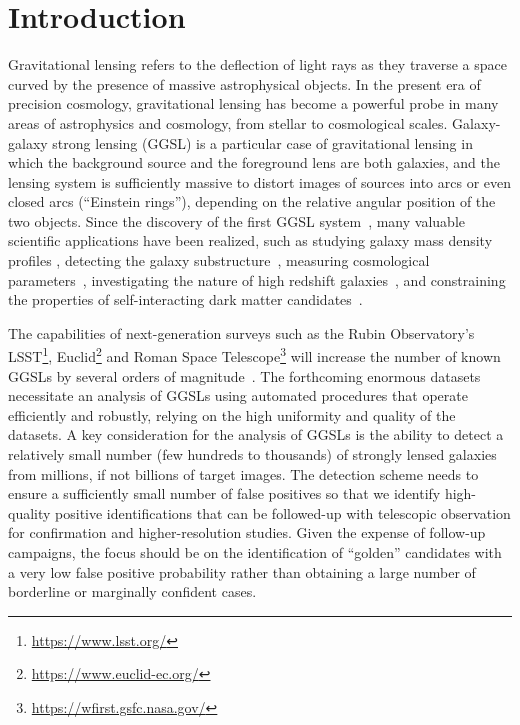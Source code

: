 \documentclass[12pt, twocolumn, apj]{openjournal}
\begin{document}
\section{Introduction}
Gravitational lensing refers to the deflection of light rays as they traverse a space curved by the presence of massive astrophysical objects. 
In the present era of precision cosmology, gravitational lensing has become a powerful probe in many areas of astrophysics and cosmology, from stellar to cosmological scales. 
Galaxy-galaxy strong lensing (GGSL) is a particular case of gravitational lensing in which the background source and the foreground lens are both galaxies, and the lensing system is sufficiently massive to distort images of sources into arcs or even closed arcs (``Einstein rings''), depending on the relative angular position of the two objects.
Since the discovery of the first GGSL system~\citep{Hewitt1988}, many valuable scientific applications have been realized, such as studying galaxy mass density profiles \citep{Sonnenfeld2015,Shu2016b,Kung2018}, detecting the galaxy substructure~\citep{Vegetti2014,Hezaveh2016,Bayer2018}, measuring cosmological parameters~\citep{Collett2014,Rana2017,Suyu2017}, investigating the nature of high redshift galaxies~\citep{Bayliss2017,Dye2018,Sharda2018}, and constraining the properties of self-interacting dark matter candidates~\citep{Shu2016,Gilman2017,Kummer2018}.

The capabilities of next-generation surveys such as the Rubin Observatory's LSST\footnote{\url{https://www.lsst.org/}},  Euclid\footnote{\url{https://www.euclid-ec.org/}} and Roman Space Telescope\footnote{\url{https://wfirst.gsfc.nasa.gov/}} 
will increase the number of known GGSLs by several orders of magnitude~\citep{Collett2015}.
The forthcoming enormous datasets necessitate an analysis of GGSLs using automated procedures that operate efficiently and robustly, relying on the high uniformity and quality of the datasets. 
A key consideration for the analysis of GGSLs is the ability to detect a relatively small number (few hundreds to thousands) of strongly lensed galaxies from millions, if not billions of target images. The detection scheme needs to ensure a sufficiently small number of false positives so that we identify high-quality positive identifications that can be followed-up with telescopic observation for confirmation and higher-resolution studies. Given the expense of follow-up campaigns, the focus should be on the identification of ``golden'' candidates with a very low false positive probability rather than obtaining a large number of borderline or marginally confident cases.
\end{document}
